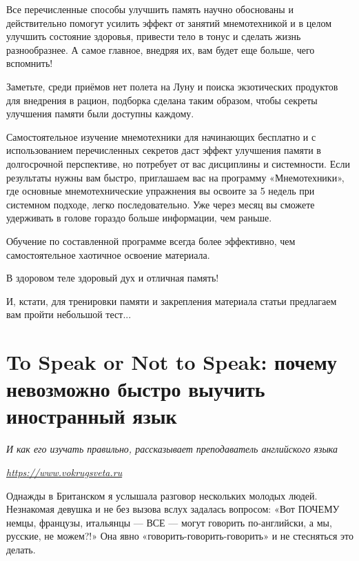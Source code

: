 Все перечисленные способы улучшить память научно обоснованы и действительно помогут усилить эффект от занятий мнемотехникой и в целом улучшить состояние здоровья, привести тело в тонус и сделать жизнь разнообразнее. А самое главное, внедряя их, вам будет еще больше, чего вспомнить!

Заметьте, среди приёмов нет полета на Луну и поиска экзотических продуктов для внедрения в рацион, подборка сделана таким образом, чтобы секреты улучшения памяти были доступны каждому.

Самостоятельное изучение мнемотехники для начинающих бесплатно и с использованием перечисленных секретов даст эффект улучшения памяти в долгосрочной перспективе, но потребует от вас дисциплины и системности. Если результаты нужны вам быстро, приглашаем вас на программу «Мнемотехники», где основные мнемотехнические упражнения вы освоите за 5 недель при системном подходе, легко последовательно. Уже через месяц вы сможете удерживать в голове гораздо больше информации, чем раньше.

Обучение по составленной программе всегда более эффективно, чем самостоятельное хаотичное освоение материала.

В здоровом теле здоровый дух и отличная память!

И, кстати, для тренировки памяти и закрепления материала статьи предлагаем вам пройти небольшой тест...


\newpage
\section[Почему невозможно быстро выучить иностранный язык]{To Speak or Not to Speak: почему невозможно быстро выучить иностранный язык}

\textit{И как его изучать правильно, рассказывает преподаватель английского языка}

{\it \url{https://www.vokrugsveta.ru}}


Однажды в Британском  я услышала разговор нескольких молодых людей. Незнакомая девушка  и не без вызова вслух задалась вопросом: «Вот ПОЧЕМУ немцы, французы, итальянцы --- ВСЕ --- могут говорить по-английски, а мы, русские, не можем?!» Она явно  «говорить-говорить-говорить» и не стесняться это делать.

